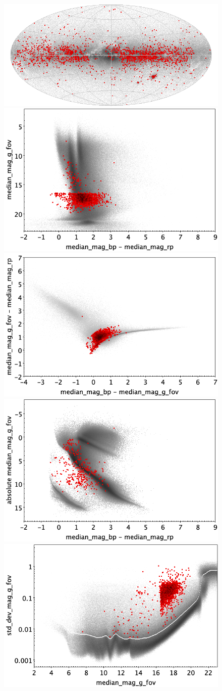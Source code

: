 \documentclass[longauth]{aa}
\begin{document}
\begin{appendix}
\begin{figure}
\centering
{} \includegraphics[width=0.6\hsize]{figures/appendix/S_trn_sky.png} \\ %
\vspace{4mm}
 \includegraphics[width=0.45\hsize]{figures/appendix/S_trn_cm.png}  %
\hspace{2mm}
 \includegraphics[width=0.45\hsize]{figures/appendix/S_trn_cc.png} \\ %
\vspace{4mm}
 \includegraphics[width=0.45\hsize]{figures/appendix/S_trn_cam.png}  %
\hspace{2mm}
 \includegraphics[width=0.45\hsize]{figures/appendix/S_trn_msd.png} \\ %

\end{figure}
\end{appendix}
\end{document}
